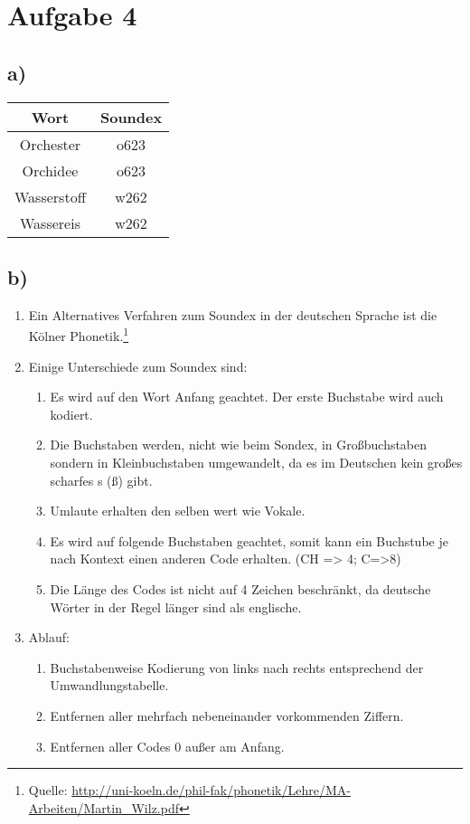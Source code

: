 \section*{Aufgabe 4}
\subsection*{a)}
\begin{tabular}{|c|c|}
\hline \textbf{Wort} & \textbf{Soundex} \\
\hline Orchester & o623 \\ 
\hline Orchidee & o623 \\ 
\hline Wasserstoff & w262 \\ 
\hline Wassereis & w262 \\ 
\hline 
\end{tabular} 
\subsection*{b)}

\begin{enumerate}
\item Ein Alternatives Verfahren zum Soundex in der deutschen Sprache ist die Kölner Phonetik.\footnote{Quelle: \url{http://uni-koeln.de/phil-fak/phonetik/Lehre/MA-Arbeiten/Martin_Wilz.pdf}}
\item Einige Unterschiede zum Soundex sind:
	\begin{enumerate}
		\item Es wird auf den Wort Anfang geachtet. Der erste Buchstabe wird auch kodiert. 
		\item Die Buchstaben werden, nicht wie beim Sondex, in Großbuchstaben sondern in Kleinbuchstaben umgewandelt, da es im Deutschen kein großes scharfes s (ß) gibt.
		\item Umlaute erhalten den selben wert wie Vokale.
		\item Es wird auf folgende Buchstaben geachtet, somit kann ein Buchstube je nach Kontext einen anderen Code erhalten. (CH => 4; C=>8)
		\item Die Länge des Codes ist nicht auf 4 Zeichen beschränkt, da deutsche Wörter in der Regel länger sind als englische. 
	\end{enumerate}
\item Ablauf:
	\begin{enumerate}
	\item Buchstabenweise Kodierung von links nach rechts entsprechend der Umwandlungstabelle. 
	\item Entfernen aller mehrfach nebeneinander vorkommenden Ziffern.
	\item Entfernen aller Codes 0 außer am Anfang.
	\end{enumerate}

\end{enumerate}


